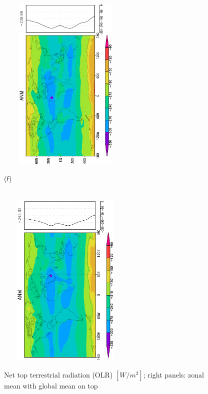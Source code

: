 \documentclass[12pt,a4paper,twoside,openright,headinclude,liststotoc,bibtotoc]{scrreprt}
\begin{document}
\begin{figure}[H]
{\includegraphics[height=8.5cm,width=6.5cm,angle=-90]
{eps/zonaltmthermrad179.eps}
}
\parbox{8.5cm}{\hspace{0.28cm}\begin{scriptsize}(f)\end{scriptsize} \vspace{-0.7cm} \\
\includegraphics[height=8.5cm,width=6.5cm,angle=-90]
{eps/zonalt21tmthermrad.eps}
}
\caption[Net top terrestrial radiation (OLR)]{Net top terrestrial radiation (OLR) $[W/m^2]$; right panels: zonal mean with global mean on top}
\label{img:thermrad}
\end{figure}
\end{document}
